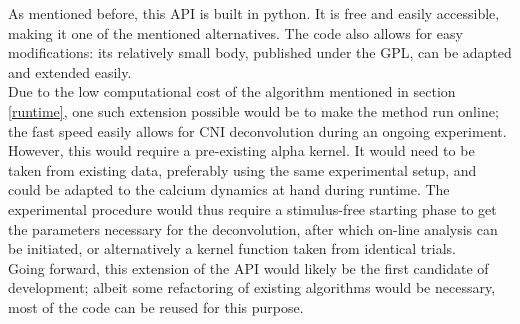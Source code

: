 \documentclass[titlepage]{article}
\begin{document}
As mentioned before, this API is built in python. It is free and easily accessible, making it one of the mentioned alternatives. The code also allows for easy modifications: its relatively small body, published under the GPL, can be adapted and extended easily.\\
Due to the low computational cost of the algorithm mentioned in section \ref{runtime}, one such extension possible would be to make the method run online; the fast speed easily allows for CNI deconvolution during an ongoing experiment.\\
However, this would require a pre-existing alpha kernel. It would need to be taken from existing data, preferably using the same experimental setup, and could be adapted to the calcium dynamics at hand during runtime. The experimental procedure would thus require a stimulus-free starting phase to get the parameters necessary for the deconvolution, after which on-line analysis can be initiated, or alternatively a kernel function taken from identical trials.\\
Going forward, this extension of the API would likely be the first candidate of development; albeit some refactoring of existing algorithms would be necessary, most of the code can be reused for this purpose.
\end{document}
